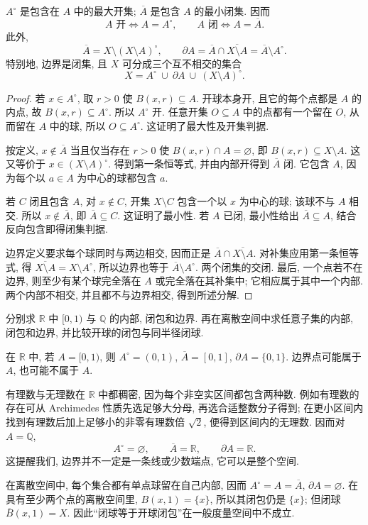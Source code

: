 \begin{theorem}[内部与闭包的基本性质]\label{ch:seq:closure-properties}
$A^\circ$ 是包含在 $A$ 中的最大开集; $\overline A$ 是包含 $A$ 的最小闭集. 因而
\[
 A\text{ 开}\Longleftrightarrow A=A^\circ,
 \qquad
 A\text{ 闭}\Longleftrightarrow A=\overline A.
\]
此外,
\[
 \overline A=X\setminus(X\setminus A)^\circ,
 \qquad
 \partial A=\overline A\cap\overline{X\setminus A}
           =\overline A\setminus A^\circ.
\]
特别地, 边界是闭集, 且 $X$ 可分成三个互不相交的集合
\[
 X=A^\circ\ \cup\ \partial A\ \cup\ (X\setminus A)^\circ.
\]
\end{theorem}
\begin{proof}
若 $x\in A^\circ$, 取 $r>0$ 使 $B(x,r)\subseteq A$. 开球本身开, 且它的每个点都是 $A$ 的内点, 故 $B(x,r)\subseteq A^\circ$. 所以 $A^\circ$ 开. 任意开集 $O\subseteq A$ 中的点都有一个留在 $O$, 从而留在 $A$ 中的球, 所以 $O\subseteq A^\circ$. 这证明了最大性及开集判据.

按定义, $x\notin\overline A$ 当且仅当存在 $r>0$ 使 $B(x,r)\cap A=\varnothing$, 即 $B(x,r)\subseteq X\setminus A$. 这又等价于 $x\in(X\setminus A)^\circ$. 得到第一条恒等式, 并由内部开得到 $\overline A$ 闭. 它包含 $A$, 因为每个以 $a\in A$ 为中心的球都包含 $a$.

若 $C$ 闭且包含 $A$, 对 $x\notin C$, 开集 $X\setminus C$ 包含一个以 $x$ 为中心的球; 该球不与 $A$ 相交. 所以 $x\notin\overline A$, 即 $\overline A\subseteq C$. 这证明了最小性. 若 $A$ 已闭, 最小性给出 $\overline A\subseteq A$, 结合反向包含即得闭集判据.

边界定义要求每个球同时与两边相交, 因而正是 $\overline A\cap\overline{X\setminus A}$. 对补集应用第一条恒等式, 得 $\overline{X\setminus A}=X\setminus A^\circ$, 所以边界也等于 $\overline A\setminus A^\circ$. 两个闭集的交闭. 最后, 一个点若不在边界, 则至少有某个球完全落在 $A$ 或完全落在其补集中; 它相应属于其中一个内部. 两个内部不相交, 并且都不与边界相交, 得到所述分解.
\end{proof}

\begin{example}
分别求 $\mathbb{R}$ 中 $[0,1)$ 与 $\mathbb{Q}$ 的内部, 闭包和边界. 再在离散空间中求任意子集的内部, 闭包和边界, 并比较开球的闭包与同半径闭球.
\end{example}
\begin{solution}
在 $\mathbb{R}$ 中, 若 $A=[0,1)$, 则 $A^\circ=(0,1)$, $\overline A=[0,1]$, $\partial A=\{0,1\}$. 边界点可能属于 $A$, 也可能不属于 $A$.

有理数与无理数在 $\mathbb{R}$ 中都稠密, 因为每个非空实区间都包含两种数. 例如有理数的存在可从 Archimedes 性质先选足够大分母, 再选合适整数分子得到; 在更小区间内找到有理数后加上足够小的非零有理数倍 $\sqrt2$, 便得到区间内的无理数. 因而对 $A=\mathbb{Q}$,
\[
 A^\circ=\varnothing,\qquad \overline A=\mathbb{R},\qquad
 \partial A=\mathbb{R}.
\]
这提醒我们, 边界并不一定是一条线或少数端点, 它可以是整个空间.

在离散空间中, 每个集合都有单点球留在自己内部, 因而 $A^\circ=A=\overline A$, $\partial A=\varnothing$. 在具有至少两个点的离散空间里, $B(x,1)=\{x\}$, 所以其闭包仍是 $\{x\}$; 但闭球 $\overline B(x,1)=X$. 因此``闭球等于开球闭包''在一般度量空间中不成立.
\end{solution}


